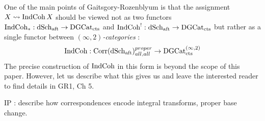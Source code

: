 \documentclass[./main.tex]{subfiles}
\begin{document}
  
One of the main points of Gaitsgory-Rozenblyum is that
the assignment $X \rightsquigarrow \mathrm{IndCoh}\,X$ should be viewed
not as two functors $\mathrm{IndCoh}_* : \mathrm{dSch}_{\mathrm{aft}} \to \mathrm{DGCat}_{\mathrm{cts}}$ and
$\mathrm{IndCoh}^! : \mathrm{dSch}_{\mathrm{aft}} \to \mathrm{DGCat}_{\mathrm{cts}}$ but rather as a single
functor between \emph{$(\infty,2)$-categories} : 
\[
  \mathrm{IndCoh} : \mathrm{Corr}(\mathrm{dSch}_{\mathrm{aft}})_{all, all}^{proper} \to \mathrm{DGCat}_{\mathrm{cts}}^{(\infty,2)}
\]
The precise construction of $\mathrm{IndCoh}$ in this form is
beyond the scope of this paper.
However, let us describe what this gives us
and leave the interested reader to find details in GR1, Ch 5.

IP : describe how correspondences encode
integral transforms, proper base change.
\end{document}

